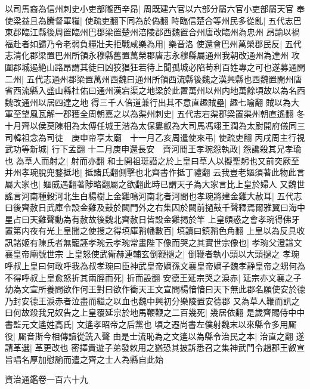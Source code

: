 以司馬裔為信州刺史小吏部隴西辛昂|{
	周既建六官以六部分屬六官小吏部屬天官}
奉使梁益且為騰督軍糧|{
	使疏吏翻下同為於偽翻}
時臨信楚合等州民多從亂|{
	五代志巴東郡臨江縣後周置臨州巴郡梁置楚州涪陵郡西魏置合州唐改臨州為忠州}
昂諭以禍福赴者如歸乃令老弱負糧壯夫拒戰咸樂為用|{
	樂音洛}
使還會巴州萬榮郡民反|{
	五代志清化郡梁置巴州所領永穆縣舊置萬榮郡唐志永穆縣屬通州我朝改通州為達州}
攻圍郡城遏絶山路昂謂其徒曰凶狡猖狂若待上聞孤城必陷苟利百姓專之可也遂募通開二州|{
	五代志通州郡梁置萬州西魏曰通州所領西流縣後魏之漢興縣也西魏置開州唐省西流縣入盛山縣杜佑曰通州漢宕渠之地梁於此置萬州以州内地萬餘頃故以為名西魏改通州以居四達之地}
得三千人倍道兼行出其不意直趣賊壘|{
	趣七喻翻}
賊以為大軍至望風瓦解一郡獲全周朝嘉之以為渠州刺史|{
	五代志宕渠郡梁置渠州朝直遙翻}
冬十月齊以侯莫陳相為太傅任城王湝為太保婁叡為大司馬馮翊王潤為太尉開府儀同三司韓祖念為司徒　庚申帝享太廟　十一月乙亥周遣使來弔|{
	使疏吏翻}
丙戌周主行視武功等新城|{
	行下孟翻}
十二月庚申還長安　齊河閒王孝琬怨執政|{
	怨讒殺其兄孝瑜也}
為草人而射之|{
	射而亦翻}
和士開祖珽譛之於上皇曰草人以擬聖躬也又前突厥至并州孝琬脫兜鍪抵地|{
	抵諸氏翻側擊也北齊書作抵丁禮翻}
云我豈老嫗須著此物此言屬大家也|{
	嫗威遇翻著陟略翻屬之欲翻此時已謂天子為大家言比上皇於婦人}
又魏世謠言河南種穀河北生白楊樹上金雞鳴河南北者河間也孝琬將建金雞大赦耳|{
	五代志曰後齊赦日武庫令設金雞及鼓於闕門外之右集囚於闕前撾鼔千聲釋焉爾雅翼曰海中星占曰天雞聲動為有赦故後魏北齊赦日皆設金雞掲於竿}
上皇頗惑之會孝琬得佛牙置第内夜有光上皇聞之使搜之得填庫矟幡數百|{
	填讀曰鎮矟色角翻}
上皇以為反具收訊諸姬有陳氏者無寵誣孝琬云孝琬常畫陛下像而哭之其實世宗像也|{
	孝琬父澄諡文襄皇帝廟號世宗}
上皇怒使武衛赫連輔玄倒鞭撾之|{
	倒鞭者執小頭以大頭撾之}
孝琬呼叔上皇曰何敢呼我為叔孝琬曰臣神武皇帝嫡孫文襄皇帝嫡子魏孝静皇帝之甥何為不得呼叔上皇愈怒折其兩脛而死|{
	折而設翻}
安德王延宗哭之淚赤|{
	延宗亦文襄之子幼為文宣所養問欲作何王對曰欲作衝天王文宣問楊愔愔曰天下無此郡名願使安於德乃封安德王淚赤者泣盡而繼之以血也魏中興初分樂陵置安德郡}
又為草人鞭而訊之曰何故殺我兄奴告之上皇覆延宗於地馬鞭鞭之二百幾死|{
	幾居依翻}
是歲齊賜侍中中書監元文遙姓高氏|{
	文遙孝昭帝之后黨也}
頃之遷尚書左僕射魏末以來縣令多用厮役|{
	厮音斯今相傳讀從詵入聲}
由是士流恥為之文遙以為縣令治民之本|{
	治直之翻}
遂請革選|{
	革更改也}
密擇貴遊子弟發敕用之猶恐其披訴悉召之集神武門令趙郡王叡宣旨唱名厚加慰諭而遣之齊之士人為縣自此始

資治通鑑卷一百六十九
